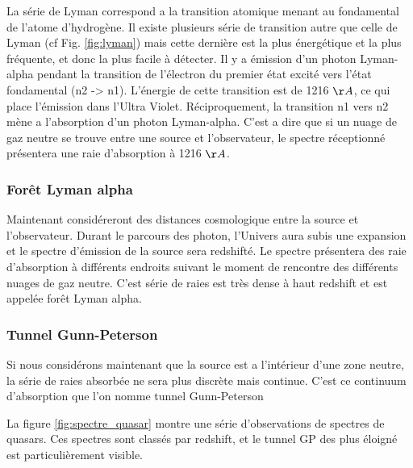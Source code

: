 La série de Lyman correspond a la transition atomique menant au fondamental de l'atome d'hydrogène.
Il existe plusieurs série de transition autre que celle de Lyman (cf Fig. \ref{fig:lyman}) mais cette dernière est la plus énergétique et la plus fréquente, et donc la plus facile à détecter.
Il y a émission d'un photon Lyman-alpha pendant la transition de l'électron du premier état excité vers l’état fondamental (n2 -> n1).
L'énergie de cette transition est de 1216 $\AA$,  ce qui place l’émission dans l'Ultra Violet.
Réciproquement, la transition n1 vers n2 mène a l'absorption d'un photon Lyman-alpha.
C'est a dire que si un nuage de gaz neutre se trouve entre une source et l'observateur, le spectre réceptionné présentera une raie d'absorption à 1216 $\AA$.

\subsubsection*{Forêt Lyman alpha}

Maintenant considéreront des distances cosmologique entre la source et l'observateur.
Durant le parcours des photon, l'Univers aura subis une expansion et le spectre d'émission de la source sera redshifté.
Le spectre présentera des raie d’absorption à différents endroits suivant le moment de rencontre des différents nuages de gaz neutre.
C'est série de raies est très dense à haut redshift et est appelée forêt Lyman alpha.

\subsubsection*{Tunnel Gunn-Peterson}

Si nous considérons maintenant que la source est a l’intérieur d'une zone neutre, la série de raies absorbée ne sera plus discrète mais continue.
C'est ce continuum d’absorption que l'on nomme tunnel Gunn-Peterson \cite{1965ApJ...141.1295S}

La figure \ref{fig:spectre_quasar} montre une série d'observations de spectres de quasars.
Ces spectres sont classés par redshift, et le tunnel GP des plus éloigné est particulièrement visible.


